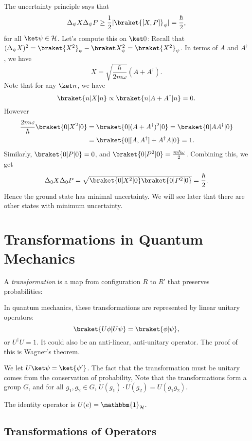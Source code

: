 \documentclass[12pt]{article}
\begin{document}
The uncertainty principle says that
\[
	\Delta_\psi X \Delta_\psi P \geq \frac{1}{2}|\braket{[X,P]}_\psi| = \frac{\hbar}{2},
\]
for all $\ket \psi \in \mathcal{H}$. Let's compute this on $\ket 0$: Recall that $(\Delta_\psi X)^2 = \braket{X^2}_\psi -  \braket X_\psi^2 = \braket{X^2}_\psi$. In terms of $A$ and $A^{\dagger}$, we have
\[
	X = \sqrt{\frac{\hbar}{2 m \omega}}(A + A^{\dagger}).
\] 
Note that for any $\ket n$, we have
\[
	\braket{n|X|n} \propto \braket{n|A+A^{\dagger}|n} = 0.
\]
However
\begin{align*}
	\frac{2 m\omega}{\hbar} \braket{0|X^2|0} &= \braket{0|(A+A^{\dagger})^2|0} = \braket{0|AA^{\dagger}|0} \\
						 &= \braket{0|[A,A^{\dagger}] + A^{\dagger}A|0} = 1.
\end{align*}
Similarly, $\braket{0|P|0} = 0$, and $\braket{0|P^2|0} = \frac{m\hbar \omega}{2}$. Combining this, we get
\[
	\Delta_0 X \Delta_0P = \sqrt{\braket{0|X^2|0}\braket{0|P^2|0}} = \frac{\hbar}{2}.
\]
Hence the ground state has minimal uncertainty. We will see later that there are other states with minimum uncertainty.

\newpage

\section{Transformations in Quantum Mechanics}
\label{sec:transformations}

A \emph{transformation} is a map from configuration $R$ to $R$' that preserves probabilities:

In quantum mechanics, these transformations are represented by linear unitary operators:
\[
	\braket{U\phi|U\psi} = \braket{\phi|\psi},
\]
or $U^{\dagger}U = 1$. It could also be an anti-linear, anti-unitary operator. The proof of this is Wagner's theorem.

We let $U \ket \psi = \ket{\psi'}$. The fact that the transformation must be unitary comes from the conservation of probability, Note that the transformations form a group $G$, and for all $g_1, g_2 \in G$, $U(g_1) \cdot U(g_2) = U(g_1 g_2)$.

The identity operator is $U(e) = \mathbbm{1}_{\mathcal{H}}$.

\subsection{Transformations of Operators}
\label{sub:transform_ops}
\end{document}
